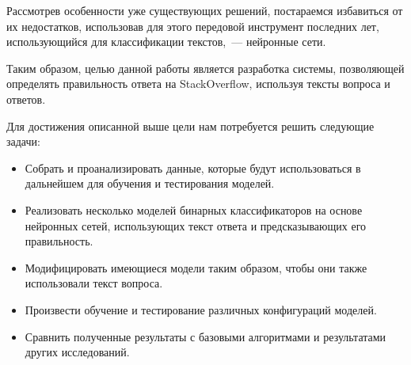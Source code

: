 \documentclass[../diploma.tex]{subfiles}
\begin{document}
	\label{sec:goals}

    Рассмотрев особенности уже существующих решений, постараемся избавиться от их недостатков, использовав для этого передовой инструмент последних лет, 
	использующийся для классификации текстов,~--- нейронные сети.

	Таким образом, целью данной работы является разработка системы, позволяющей определять правильность ответа на StackOverflow, используя тексты вопроса и ответов.
	
	Для достижения описанной выше цели нам потребуется решить следующие задачи:

	\begin{itemize}

		\item
		Собрать и проанализировать данные, которые будут использоваться в дальнейшем для обучения и тестирования моделей.
		
		\item
		Реализовать несколько моделей бинарных классификаторов на основе нейронных сетей, использующих текст ответа и предсказывающих его правильность.

		\item
		Модифицировать имеющиеся модели таким образом, чтобы они также использовали текст вопроса.

		\item
		Произвести обучение и тестирование различных конфигураций моделей. 

		\item
		Сравнить полученные результаты с базовыми алгоритмами и результатами других исследований.


	\end{itemize}
\end{document}
